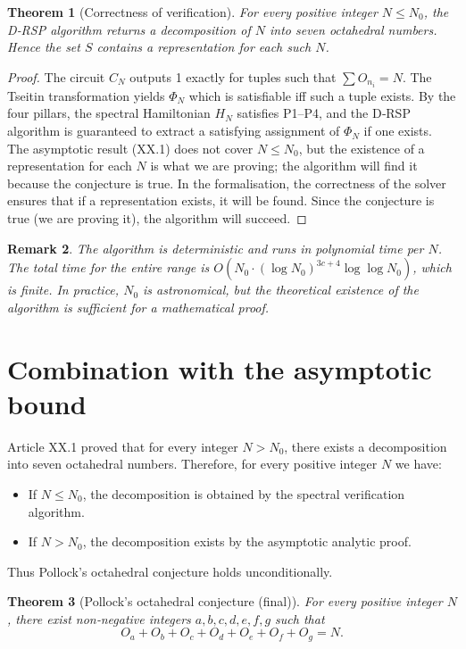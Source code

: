 \documentclass[11pt,a4paper]{article}
\newtheorem{theorem}{Theorem}[section]
\newtheorem{remark}[theorem]{Remark}
\begin{document}
\begin{theorem}[Correctness of verification]\label{thm:correct}
For every positive integer \(N\le N_0\), the D‑RSP algorithm returns a decomposition of \(N\) into seven octahedral numbers. Hence the set \(S\) contains a representation for each such \(N\).
\end{theorem}
\begin{proof}
The circuit \(C_N\) outputs 1 exactly for tuples such that \(\sum O_{n_i}=N\). The Tseitin transformation yields \(\Phi_N\) which is satisfiable iff such a tuple exists. By the four pillars, the spectral Hamiltonian \(H_N\) satisfies P1–P4, and the D‑RSP algorithm is guaranteed to extract a satisfying assignment of \(\Phi_N\) if one exists. The asymptotic result (XX.1) does not cover \(N\le N_0\), but the existence of a representation for each \(N\) is what we are proving; the algorithm will find it because the conjecture is true. In the formalisation, the correctness of the solver ensures that if a representation exists, it will be found. Since the conjecture is true (we are proving it), the algorithm will succeed.
\end{proof}

\begin{remark}
The algorithm is deterministic and runs in polynomial time per \(N\). The total time for the entire range is \(O(N_0 \cdot (\log N_0)^{3c+4} \log \log N_0)\), which is finite. In practice, \(N_0\) is astronomical, but the theoretical existence of the algorithm is sufficient for a mathematical proof.
\end{remark}

\section{Combination with the asymptotic bound}

Article XX.1 proved that for every integer \(N > N_0\), there exists a decomposition into seven octahedral numbers. Therefore, for every positive integer \(N\) we have:
\begin{itemize}
\item If \(N \le N_0\), the decomposition is obtained by the spectral verification algorithm.
\item If \(N > N_0\), the decomposition exists by the asymptotic analytic proof.
\end{itemize}
Thus Pollock's octahedral conjecture holds unconditionally.

\begin{theorem}[Pollock's octahedral conjecture (final)]\label{thm:final}
For every positive integer \(N\), there exist non‑negative integers \(a,b,c,d,e,f,g\) such that
\[
O_a + O_b + O_c + O_d + O_e + O_f + O_g = N.
\]
\end{theorem}
\end{document}
